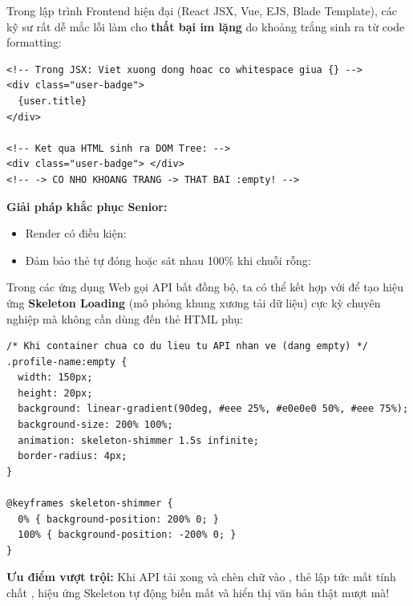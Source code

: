 \begin{conceptBox}
Trong lập trình Frontend hiện đại (React JSX, Vue, EJS, Blade Template), các kỹ sư rất dễ mắc lỗi làm cho  \textbf{thất bại im lặng} do khoảng trắng sinh ra từ code formatting:
\begin{codeWindow}
\begin{lstlisting}[language=HTML5]
<!-- Trong JSX: Viet xuong dong hoac co whitespace giua {} -->
<div class="user-badge">
  {user.title} 
</div>

<!-- Ket qua HTML sinh ra DOM Tree: -->
<div class="user-badge"> </div> 
<!-- -> CO NHO KHOANG TRANG -> THAT BAI :empty! -->
\end{lstlisting}
\end{codeWindow}
\par\vspace{4pt}
\textbf{Giải pháp khắc phục Senior:} 
\begin{itemize}[leftmargin=1.5em, itemsep=2pt, parsep=0pt]
    \item Render có điều kiện: 
    \item Đảm bảo thẻ tự đóng hoặc sát nhau 100\% khi chuỗi rỗng: 
\end{itemize}
\end{conceptBox}

\begin{tipBox}
Trong các ứng dụng Web gọi API bất đồng bộ, ta có thể kết hợp  với  để tạo hiệu ứng \textbf{Skeleton Loading} (mô phỏng khung xương tải dữ liệu) cực kỳ chuyên nghiệp mà không cần dùng đến thẻ HTML phụ:
\begin{codeWindow}
\begin{lstlisting}[language=CSS3]
/* Khi container chua co du lieu tu API nhan ve (dang empty) */
.profile-name:empty {
  width: 150px;
  height: 20px;
  background: linear-gradient(90deg, #eee 25%, #e0e0e0 50%, #eee 75%);
  background-size: 200% 100%;
  animation: skeleton-shimmer 1.5s infinite;
  border-radius: 4px;
}

@keyframes skeleton-shimmer {
  0% { background-position: 200% 0; }
  100% { background-position: -200% 0; }
}
\end{lstlisting}
\end{codeWindow}
\textbf{Ưu điểm vượt trội:} Khi API tải xong và chèn chữ vào , thẻ lập tức mất tính chất , hiệu ứng Skeleton tự động biến mất và hiển thị văn bản thật mượt mà!
\end{tipBox}

